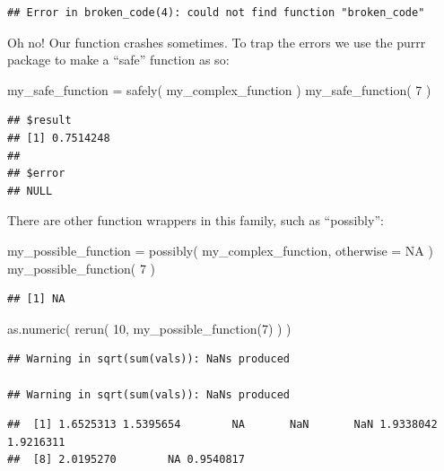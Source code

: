 \documentclass[
]{book}
\newenvironment{Shaded}{\begin{snugshade}}{\end{snugshade}}
\newcommand{\AttributeTok}[1]{\textcolor[rgb]{0.77,0.63,0.00}{#1}}
\newcommand{\ConstantTok}[1]{\textcolor[rgb]{0.00,0.00,0.00}{#1}}
\newcommand{\DecValTok}[1]{\textcolor[rgb]{0.00,0.00,0.81}{#1}}
\newcommand{\FunctionTok}[1]{\textcolor[rgb]{0.00,0.00,0.00}{#1}}
\newcommand{\NormalTok}[1]{#1}
\newcommand{\OtherTok}[1]{\textcolor[rgb]{0.56,0.35,0.01}{#1}}
\begin{document}
\begin{verbatim}
## Error in broken_code(4): could not find function "broken_code"
\end{verbatim}

Oh no! Our function crashes sometimes.
To trap the errors we use the purrr package to make a ``safe'' function as so:

\begin{Shaded}
\begin{Highlighting}[]
\NormalTok{my\_safe\_function }\OtherTok{=} \FunctionTok{safely}\NormalTok{( my\_complex\_function )}
\FunctionTok{my\_safe\_function}\NormalTok{( }\DecValTok{7}\NormalTok{ )}
\end{Highlighting}
\end{Shaded}

\begin{verbatim}
## $result
## [1] 0.7514248
## 
## $error
## NULL
\end{verbatim}

There are other function wrappers in this family, such as ``possibly'':

\begin{Shaded}
\begin{Highlighting}[]
\NormalTok{my\_possible\_function }\OtherTok{=} \FunctionTok{possibly}\NormalTok{( my\_complex\_function, }
                                 \AttributeTok{otherwise =} \ConstantTok{NA}\NormalTok{ )}
\FunctionTok{my\_possible\_function}\NormalTok{( }\DecValTok{7}\NormalTok{ )}
\end{Highlighting}
\end{Shaded}

\begin{verbatim}
## [1] NA
\end{verbatim}

\begin{Shaded}
\begin{Highlighting}[]
\FunctionTok{as.numeric}\NormalTok{( }\FunctionTok{rerun}\NormalTok{( }\DecValTok{10}\NormalTok{, }\FunctionTok{my\_possible\_function}\NormalTok{(}\DecValTok{7}\NormalTok{) ) )}
\end{Highlighting}
\end{Shaded}

\begin{verbatim}
## Warning in sqrt(sum(vals)): NaNs produced

## Warning in sqrt(sum(vals)): NaNs produced
\end{verbatim}

\begin{verbatim}
##  [1] 1.6525313 1.5395654        NA       NaN       NaN 1.9338042 1.9216311
##  [8] 2.0195270        NA 0.9540817
\end{verbatim}
\end{document}
